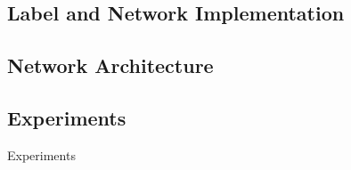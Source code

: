 \documentclass[conference]{IEEEtran}
\begin{document}
	 \subsection{Label and Network Implementation}
	 
	 
	 
	 
	\subsection{Network Architecture}
	
	





\subsection{Experiments} \label{Experiments}
Experiments 
\end{document}
